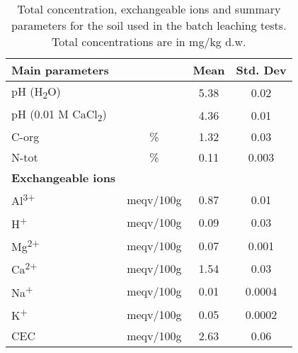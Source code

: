 \begin{table}
\centering
\caption{Total concentration, exchangeable ions and summary parameters for the soil used in the batch leaching tests. Total concentrations are in mg/kg d.w.}
\label{apptab:soil}
\begin{tabular}{lccc}
\toprule
\multicolumn{1}{l}{\textbf{Main parameters}}          &                               & \textbf{Mean}                          & \textbf{Std. Dev}                      \\ \hline \addlinespace
pH (H\textsubscript{2}O)                      &                               & 5.38                          & 0.02                          \\
pH (0.01 M CaCl\textsubscript{2})             &                               & 4.36                          & 0.01                          \\
C-org                         & \%                            & 1.32                          & 0.03                          \\
N-tot                         & \%                            & 0.11                          & 0.003                         \\ \hline
\textbf{Exchangeable ions}    & \multicolumn{1}{l}{\textbf{}} & \multicolumn{1}{l}{\textbf{}} & \multicolumn{1}{l}{\textbf{}} \\ \hline \addlinespace
Al\textsuperscript{3+}                          & meqv/100g                     & 0.87                          & 0.01                          \\
H\textsuperscript{+}                            & meqv/100g                     & 0.09                          & 0.03                          \\
Mg\textsuperscript{2+}                          & meqv/100g                     & 0.07                          & 0.001                         \\
Ca\textsuperscript{2+}                          & meqv/100g                     & 1.54                          & 0.03                          \\
Na\textsuperscript{+}                           & meqv/100g                     & 0.01                          & 0.0004                        \\
K\textsuperscript{+}                            & meqv/100g                     & 0.05                          & 0.0002                        \\
CEC                           & meqv/100g                     & 2.63                          & 0.06                          \\ \hline

\end{tabular}
\end{table}
